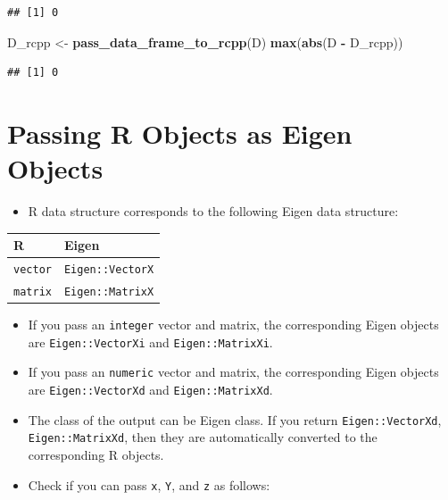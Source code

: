 \documentclass[]{book}
\newenvironment{Shaded}{\begin{snugshade}}{\end{snugshade}}
\newcommand{\KeywordTok}[1]{\textcolor[rgb]{0.13,0.29,0.53}{\textbf{#1}}}
\newcommand{\StringTok}[1]{\textcolor[rgb]{0.31,0.60,0.02}{#1}}
\newcommand{\OperatorTok}[1]{\textcolor[rgb]{0.81,0.36,0.00}{\textbf{#1}}}
\newcommand{\NormalTok}[1]{#1}
\providecommand{\tightlist}{%
  \setlength{\itemsep}{0pt}\setlength{\parskip}{0pt}}
\begin{document}
\begin{verbatim}
## [1] 0
\end{verbatim}

\begin{Shaded}
\begin{Highlighting}[]
\NormalTok{D_rcpp <-}\StringTok{ }\KeywordTok{pass_data_frame_to_rcpp}\NormalTok{(D)}
\KeywordTok{max}\NormalTok{(}\KeywordTok{abs}\NormalTok{(D }\OperatorTok{-}\StringTok{ }\NormalTok{D_rcpp))}
\end{Highlighting}
\end{Shaded}

\begin{verbatim}
## [1] 0
\end{verbatim}

\section{Passing R Objects as Eigen
Objects}\label{passing-r-objects-as-eigen-objects}

\begin{itemize}
\tightlist
\item
  R data structure corresponds to the following Eigen data structure:
\end{itemize}

\begin{longtable}[]{@{}ll@{}}
\toprule
R & Eigen\tabularnewline
\midrule
\endhead
\texttt{vector} & \texttt{Eigen::VectorX}\tabularnewline
\texttt{matrix} & \texttt{Eigen::MatrixX}\tabularnewline
\bottomrule
\end{longtable}

\begin{itemize}
\tightlist
\item
  If you pass an \texttt{integer} vector and matrix, the corresponding
  Eigen objects are \texttt{Eigen::VectorXi} and
  \texttt{Eigen::MatrixXi}.
\item
  If you pass an \texttt{numeric} vector and matrix, the corresponding
  Eigen objects are \texttt{Eigen::VectorXd} and
  \texttt{Eigen::MatrixXd}.
\item
  The class of the output can be Eigen class. If you return
  \texttt{Eigen::VectorXd}, \texttt{Eigen::MatrixXd}, then they are
  automatically converted to the corresponding R objects.
\item
  Check if you can pass \texttt{x}, \texttt{Y}, and \texttt{z} as
  follows:
\end{itemize}
\end{document}
